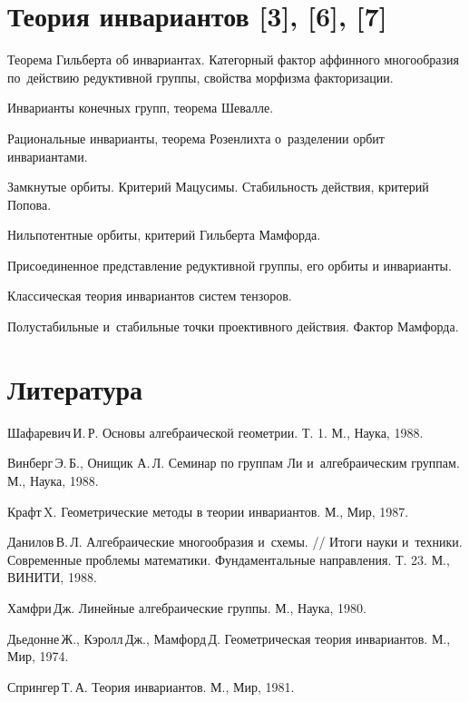 \documentclass[a4paper]{article}
\begin{document}
\section*{Теория инвариантов [3], [6], [7]}
\begin{items}{-2}
\item Теорема Гильберта об инвариантах. Категорный фактор аффинного многообразия
по~действию редуктивной группы, свойства морфизма факторизации.
\item Инварианты конечных групп, теорема Шевалле.
\item Рациональные инварианты, теорема Розенлихта о~разделении орбит инвариантами.
\item Замкнутые орбиты. Критерий Мацусимы. Стабильность действия, критерий Попова.
\item Нильпотентные орбиты, критерий Гильберта Мамфорда.
\item Присоединенное представление редуктивной группы, его орбиты и инварианты.
\item Классическая теория инвариантов систем тензоров.
\item Полустабильные и~стабильные точки проективного действия. Фактор Мамфорда.
\end{items}

\section*{Литература}
\begin{nums}{-2}
\item Шафаревич\,И.\,Р. Основы алгебраической геометрии. Т. 1. М., Наука, 1988.
\item Винберг\,Э.\,Б., Онищик А.\,Л. Семинар по группам Ли и~алгебраическим группам. М., Наука, 1988.
\item Крафт\,X. Геометрические методы в теории инвариантов. М., Мир, 1987.
\item Данилов\,В.\,Л. Алгебраические многообразия и~схемы. // Итоги науки и~техники.
Современные проблемы математики. Фундаментальные направления. Т. 23. М., ВИНИТИ, 1988.
\item Хамфри\,Дж. Линейные алгебраические группы. М., Наука, 1980.
\item Дьедонне\,Ж., Кэролл\,Дж., Мамфорд\,Д. Геометрическая теория инвариантов. М., Мир, 1974.
\item Спрингер\,Т.\,А. Теория инвариантов. М., Мир, 1981.
\end{nums}

\medskip\dmvntrail
\end{document}
